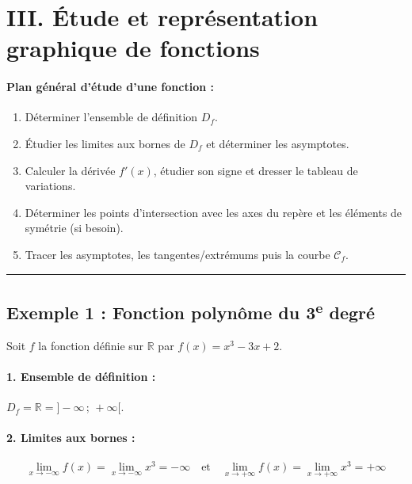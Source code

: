 \documentclass[12pt,a4paper]{article}
\begin{document}

\section*{\color{myred}III. Étude et représentation graphique de fonctions}

\paragraph{Plan général d'étude d'une fonction :}
\begin{enumerate}[label=\arabic*.]
    \item Déterminer l'ensemble de définition $D_f$.
    \item Étudier les limites aux bornes de $D_f$ et déterminer les asymptotes.
    \item Calculer la dérivée $f'(x)$, étudier son signe et dresser le tableau de variations.
    \item Déterminer les points d'intersection avec les axes du repère et les éléments de symétrie (si besoin).
    \item Tracer les asymptotes, les tangentes/extrémums puis la courbe $\mathcal{C}_f$.
\end{enumerate}

\vspace{0.3cm}
\hrule
\vspace{0.3cm}

\subsection*{\color{myred}Exemple 1 : Fonction polynôme du 3\textsuperscript{e} degré}

Soit $f$ la fonction définie sur $\mathbb{R}$ par $f(x) = x^3 - 3x + 2$.

\paragraph{1. Ensemble de définition :} $D_f = \mathbb{R} = ]-\infty \,;\, +\infty[$.

\paragraph{2. Limites aux bornes :}
\[
\lim_{x \to -\infty} f(x) = \lim_{x \to -\infty} x^3 = -\infty \quad \text{et} \quad \lim_{x \to +\infty} f(x) = \lim_{x \to +\infty} x^3 = +\infty
\]
\end{document}
